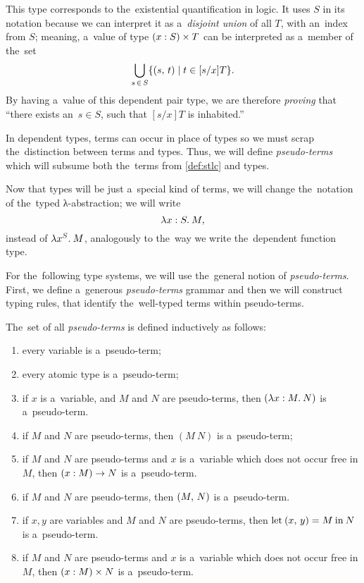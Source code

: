 This type corresponds to the~existential quantification in logic. It uses $S$ in
its notation because we can interpret it as a~\emph{disjoint union} of all $T$,
with an~index from $S$; meaning, a~value of type $(x \overset{}: S) \times T$ can be
interpreted as a~member of the~set
\[
  \bigcup_{s \, \in \, S} \{ (s, \, t) \mid t \in [s/x]T \}.
\]
By having a~value of this dependent pair type, we are therefore \emph{proving}
that ``there exists an~$s \in S$, such that $[s/x]T$ is inhabited.''

In dependent types, terms can occur in place of types so we must scrap
the~distinction between terms and types. Thus, we will define
\emph{pseudo-terms} which will subsume both the~terms from \autoref{def:stlc}
and types.

Now that types will be just a~special kind of terms, we will change the~notation
of the~typed λ-abstraction; we will write
\[
  \lambda x \overset{}: S . \: M,
\]
instead of $\lambda x^S . \: M$, analogously to the~way we write the~dependent
function type.


For the~following type systems, we will use the~general notion of
\emph{pseudo-terms}. First, we define a~generous \emph{pseudo-terms} grammar and
then we will construct typing rules, that identify the~well-typed terms within
pseudo-terms.

\begin{definition}\label{def:pseudo-term}
  The~set of all \emph{pseudo-terms} is defined inductively as follows:
  \begin{enumerate} %
    \item every variable is a~pseudo-term;
    \item every atomic type is a~pseudo-term;
    \item if $x$ is a~variable, and $M$ and $N$ are pseudo-terms, then
      $(\lambda x \overset{}: M . \: N)$ is a~pseudo-term.
    \item if $M$ and $N$ are pseudo-terms, then $(M \: N)$ is a~pseudo-term;
    \item if $M$ and $N$ are pseudo-terms and $x$ is a~variable which does not
      occur free in $M$, then $(x : M) \to N$ is a~pseudo-term.
    \item if $M$ and $N$ are pseudo-terms, then $(M, \, N)$ is a~pseudo-term.
    \item if $x, y$ are variables and $M$ and $N$ are pseudo-terms, then
      $\textrm{let} \: (x, \, y) = M \: \textrm{in} \: N$ is a~pseudo-term.
    \item if $M$ and $N$ are pseudo-terms and $x$ is a~variable which does not
      occur free in $M$, then $(x \overset{}: M) \times N$ is a~pseudo-term.
  \end{enumerate}
\end{definition}

